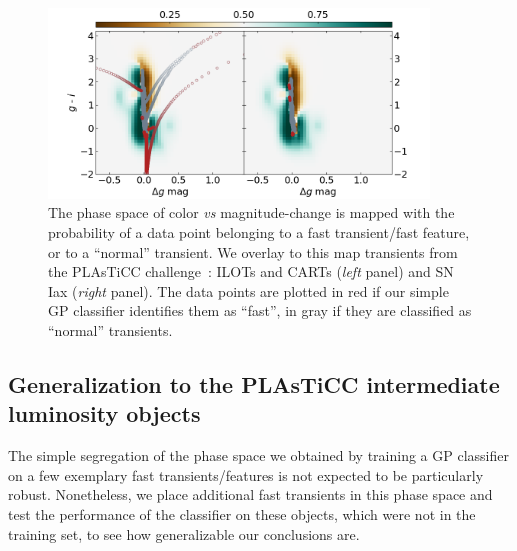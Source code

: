 \documentclass[letterpaper,longauthor,trackchanges,twocolumn,onecolappendix,sort&compress]{aastex62}
\begin{document}
\begin{figure}
    \begin{center}
    \includegraphics[width=0.9\textwidth]{figures/GPclassifierPLASTICC_40_00.png}
    \caption{The phase space of color \emph{vs} magnitude-change is mapped with the probability of a data point belonging to a fast transient/fast feature, or to a ``normal'' transient. We overlay to this map transients from the PLAsTiCC challenge~\citep{plasticc}: ILOTs and CARTs (\emph{left} panel) and SN Iax (\emph{right} panel). The data points are plotted in red if our simple GP classifier identifies them as ``fast'', in gray if they are classified as ``normal'' transients.}
    \end{center}
    \label{fig:PLAsTiCC}
\end{figure}



\subsection{Generalization to the PLAsTiCC intermediate luminosity objects}
The simple segregation of the phase space we obtained by training a GP classifier on a few exemplary fast transients/features is not expected to be particularly robust. Nonetheless, we place additional fast transients in this phase space and test the performance of the classifier on these objects, which were not in the training set, to see how generalizable our conclusions are. 
\end{document}
